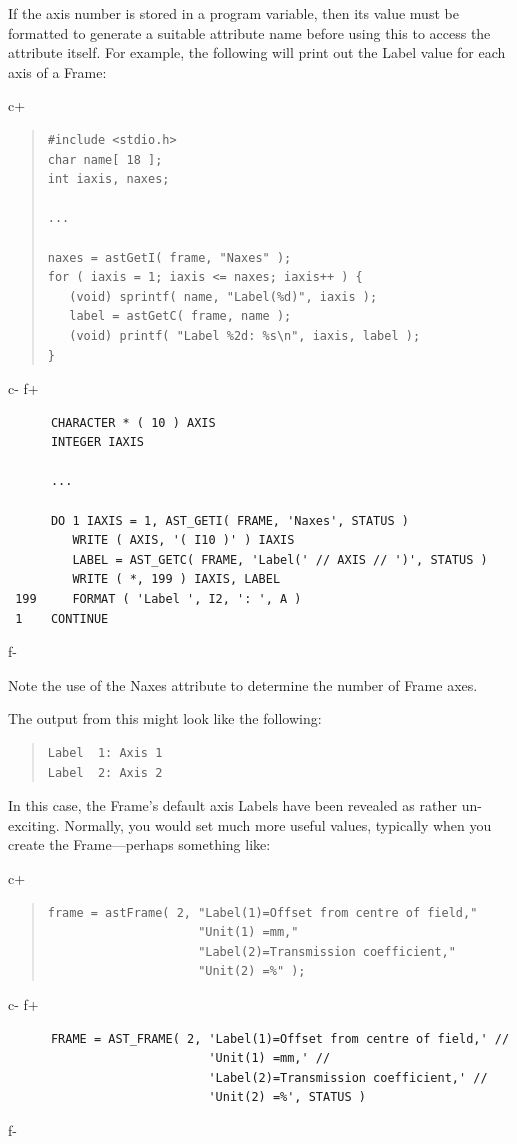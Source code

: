 \documentclass[twoside,11pt]{article}
\begin{document}
If the axis number is stored in a program variable, then its value
must be formatted to generate a suitable attribute name before using
this to access the attribute itself. For example, the following will
print out the Label value for each axis of a Frame:

c+
\begin{quote}
\small
\begin{verbatim}
#include <stdio.h>
char name[ 18 ];
int iaxis, naxes;

...

naxes = astGetI( frame, "Naxes" );
for ( iaxis = 1; iaxis <= naxes; iaxis++ ) {
   (void) sprintf( name, "Label(%d)", iaxis );
   label = astGetC( frame, name );
   (void) printf( "Label %2d: %s\n", iaxis, label );
}
\end{verbatim}
\normalsize
\end{quote}
c-
f+
\small
\begin{verbatim}
      CHARACTER * ( 10 ) AXIS
      INTEGER IAXIS

      ...

      DO 1 IAXIS = 1, AST_GETI( FRAME, 'Naxes', STATUS )
         WRITE ( AXIS, '( I10 )' ) IAXIS
         LABEL = AST_GETC( FRAME, 'Label(' // AXIS // ')', STATUS )
         WRITE ( *, 199 ) IAXIS, LABEL
 199     FORMAT ( 'Label ', I2, ': ', A )
 1    CONTINUE
\end{verbatim}
\normalsize
f-

Note the use of the Naxes attribute to determine the number of Frame
axes.

The output from this might look like the following:

\begin{quote}
\begin{verbatim}
Label  1: Axis 1
Label  2: Axis 2
\end{verbatim}
\end{quote}

In this case, the Frame's default axis Labels have been revealed as
rather un-exciting. Normally, you would set much more useful values,
typically when you create the Frame---perhaps something like:

c+
\begin{quote}
\small
\begin{verbatim}
frame = astFrame( 2, "Label(1)=Offset from centre of field,"
                     "Unit(1) =mm,"
                     "Label(2)=Transmission coefficient,"
                     "Unit(2) =%" );
\end{verbatim}
\normalsize
\end{quote}
c-
f+
\small
\begin{verbatim}
      FRAME = AST_FRAME( 2, 'Label(1)=Offset from centre of field,' //
                            'Unit(1) =mm,' //
                            'Label(2)=Transmission coefficient,' //
                            'Unit(2) =%', STATUS )
\end{verbatim}
\normalsize
f-
\end{document}
